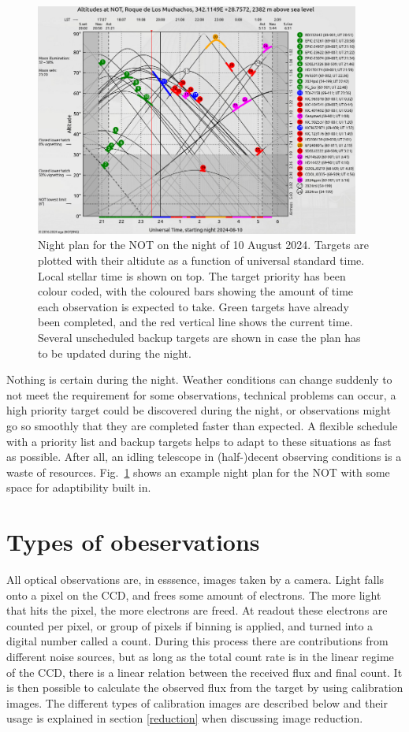 \documentclass[a4paper,oneside,12pt, class=Latex/Classes/PhDthesisPSnPDF, crop=false]{standalone}
\begin{document}
\begin{figure}
    \centering
    \includegraphics[width=0.95\textwidth]{../Images/chapter_2/visplot.png}
    \caption{Night plan for the NOT on the night of 10 August 2024. Targets are plotted with their altidute as a function of universal standard time. Local stellar time is shown on top. The target priority has been colour coded, with the coloured bars showing the amount of time each observation is expected to take. Green targets have already been completed, and the red vertical line shows the current time. Several unscheduled backup targets are shown in case the plan has to be updated during the night.}
    \label{visplot}
\end{figure}

Nothing is certain during the night. Weather conditions can change suddenly to not meet the requirement for some observations, technical problems can occur, a high priority target could be discovered during the night, or observations might go so smoothly that they are completed faster than expected. A flexible schedule with a priority list and backup targets helps to adapt to these situations as fast as possible. After all, an idling telescope in (half-)decent observing conditions is a waste of resources. Fig.~\ref{visplot} shows an example night plan for the NOT with some space for adaptibility built in.



\section{Types of obeservations}
\label{observation_types}
All optical observations are, in esssence, images taken by a camera. Light falls onto a pixel on the CCD, and frees some amount of electrons. The more light that hits the pixel, the more electrons are freed. At readout these electrons are counted per pixel, or group of pixels if binning is applied, and turned into a digital number called a count. During this process there are contributions from different noise sources, but as long as the total count rate is in the linear regime of the CCD, there is a linear relation between the received flux and final count. It is then possible to calculate the observed flux from the target by using calibration images. The different types of calibration images are described below and their usage is explained in section \ref{reduction} when discussing image reduction.
\end{document}
